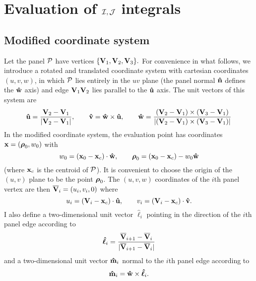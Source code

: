 \documentclass[letterpaper]{article}
\newcommand{\vbhatt}[1]{\boldsymbol{\hat #1}}
\begin{document}
\newpage
\section{Evaluation of $\mathcal{I}, \mathcal{J}$ integrals}

\subsection{Modified coordinate system}

Let the panel $\mathcal{P}$ have vertices
$\{\mathbf{V}_1, \mathbf{V}_2, \mathbf{V}_3\}.$
For convenience in what follows, we introduce a
rotated and translated coordinate system with 
cartesian coordinates
$(u,v,w)$, in which $\mathcal{P}$ lies entirely in the $uv$
plane (the panel normal $\mathbf{\hat n}$ defines the $\mathbf{\hat w}$ axis)
and edge $\mathbf{V}_1 \mathbf{V}_2$ lies parallel to the 
$\mathbf{\hat u}$ axis. The unit vectors of this system 
are 
$$ \mathbf{\hat u}=\frac{\mathbf{V}_2 - \mathbf{V}_1}{|\mathbf{V}_2 - \mathbf{V}_1|},
   \qquad
   \mathbf{\hat v}=\mathbf{\hat w} \times \mathbf{\hat u},
   \qquad
   \mathbf{\hat w}=
    \frac{ (\mathbf{V}_2 - \mathbf{V}_1)\times(\mathbf{V}_3 - \mathbf{V}_1)}
         {|(\mathbf{V}_2 - \mathbf{V}_1)\times(\mathbf{V}_3 - \mathbf{V}_1)|}
$$
In the modified coordinate system, the evaluation point has
coordinates $\mathbf{x} = (\boldsymbol{\rho}_0, w_0)$ with
$$ w_0 = (\mathbf{x}_0 - \mathbf{x}_c) \cdot \mathbf{\hat w}, 
   \qquad
   \boldsymbol{\rho}_0 = (\mathbf{x}_0 - \mathbf{x}_c) - w_0\mathbf{\hat w}
$$
(where $\mathbf{x}_c$ is the centroid of $\mathcal{P}$).
It is convenient to choose the origin of the $(u,v)$ plane to be 
the point $\boldsymbol{\rho}_0$. The $(u,v,w)$ coordinates of the $i$th 
panel vertex are then 
$\overline{\mathbf{V}}_i = (u_i, v_i, 0)$ where
$$ u_i=(\mathbf{V}_i-\mathbf{x}_c) \cdot \mathbf{\hat u}, \qquad 
   v_i=(\mathbf{V}_i-\mathbf{x}_c) \cdot \mathbf{\hat v}.
$$
I also define a two-dimensional 
unit vector $\vbhatt{\ell}_i$ pointing in the direction
of the $i$th panel edge according to
$$ \vbhatt{\ell}_i= \frac{  \overline{\vb V}_{i+1}-\overline{\vb V}_{i} }
                         { |\overline{\vb V}_{i+1}-\overline{\vb V}_{i}| }
$$
and a two-dimensional unit vector $\mathbf{\hat m}_i$ normal to the $i$th 
panel edge according to 
$$ \vbhat{m}_i=\vbhat{w} \times \vbhatt{\ell}_i.$$
\end{document}
